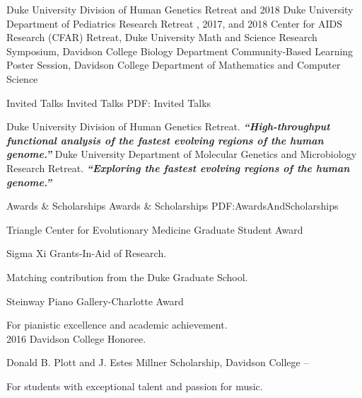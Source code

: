 \documentclass[letterpaper,MMMyyyy,nonstopmode]{simpleresumecv}
\begin{document}
\begin{Body}
\Gap
{} Duke University Division of Human Genetics Retreat
\Gap
{} and 2018 Duke University Department of Pediatrics Research Retreat
\Gap
{}, 2017, and 2018 Center for AIDS Research (CFAR) Retreat, Duke University
\Gap
{} Math and Science Research Symposium, Davidson College Biology Department
\Gap
{} Community-Based Learning Poster Session, Davidson College Department of Mathematics and Computer Science
\BigGap

\SubSection
{Invited Talks}
{Invited Talks}
{PDF: Invited Talks}

\Gap
{} Duke University Division of Human Genetics Retreat. \textit{\textbf{“High-throughput functional analysis of the fastest evolving regions of the human genome.”}}
\Gap
{} Duke University Department of Molecular Genetics and Microbiology Research Retreat. \textit{\textbf{“Exploring the fastest evolving regions of the human genome.”}}


\Section
{Awards \&\newline
Scholarships}
{Awards \& Scholarships}
{PDF:AwardsAndScholarships}

\BulletItem
Triangle Center for Evolutionary Medicine Graduate Student Award
\hfill
{}

\BulletItem
Sigma Xi Grants-In-Aid of Research.
\hfill
{}
\begin{Detail}
\Item
Matching contribution from the Duke Graduate School.
\end{Detail}

\Gap
\BulletItem
Steinway Piano Gallery-Charlotte Award 
\hfill
{}
\begin{Detail}
\Item
For pianistic excellence and academic achievement.\\
2016 Davidson College Honoree.
\end{Detail}

\Gap
\BulletItem
Donald B. Plott and J. Estes Millner Scholarship, Davidson College
\hfill
{}--
\begin{Detail}
\Item
For students with exceptional talent and passion for music.
\end{Detail}


\end{Body}
\end{document}
